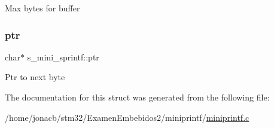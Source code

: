 Max bytes for buffer \mbox{\label{structs__mini__sprintf_a2c9e792452e1d01c6315f7880d158d0a}} 
\subsubsection{\texorpdfstring{ptr}{ptr}}
{\footnotesize\ttfamily char$\ast$ s\+\_\+mini\+\_\+sprintf\+::ptr}

Ptr to next byte 

The documentation for this struct was generated from the following file\+:\begin{DoxyCompactItemize}
\item 
/home/jonacb/stm32/\+Examen\+Embebidos2/miniprintf/\hyperlink{miniprintf_8c}{miniprintf.\+c}\end{DoxyCompactItemize}

